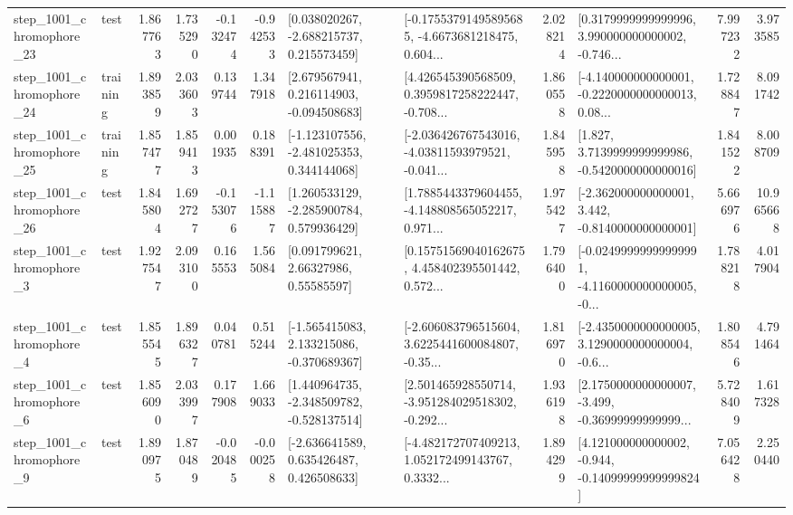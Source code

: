 \begin{tabular}{llrrrrllrlrr}
 step\_1001\_chromophore\_23 &      test &      1.867763 &    1.735290 &     -0.132474 & -0.942533 &    [0.038020267, -2.688215737, 0.215573459] &  [-0.17553791495895685, -4.6673681218475, 0.604... &       2.028214 &  [0.3179999999999996, 3.990000000000002, -0.746... &            7.997232 &          3.973585 \\
 step\_1001\_chromophore\_24 &  training &      1.893859 &    2.033603 &      0.139744 &  1.347918 &    [2.679567941, 0.216114903, -0.094508683] &  [4.426545390568509, 0.3959817258222447, -0.708... &       1.860558 &  [-4.140000000000001, -0.2220000000000013, 0.08... &            1.728847 &          8.091742 \\
 step\_1001\_chromophore\_25 &  training &      1.857477 &    1.859413 &      0.001935 &  0.188391 &   [-1.123107556, -2.481025353, 0.344144068] &  [-2.036426767543016, -4.03811593979521, -0.041... &       1.845958 &   [1.827, 3.7139999999999986, -0.5420000000000016] &            1.841522 &          8.008709 \\
 step\_1001\_chromophore\_26 &      test &      1.845804 &    1.692727 &     -0.153076 & -1.115887 &    [1.260533129, -2.285900784, 0.579936429] &  [1.7885443379604455, -4.148808565052217, 0.971... &       1.975427 &   [-2.362000000000001, 3.442, -0.8140000000000001] &            5.666976 &         10.965668 \\
  step\_1001\_chromophore\_3 &      test &      1.927547 &    2.093100 &      0.165553 &  1.565084 &       [0.091799621, 2.66327986, 0.55585597] &  [0.15751569040162675, 4.458402395501442, 0.572... &       1.796400 &  [-0.02499999999999991, -4.1160000000000005, -0... &            1.788218 &          4.017904 \\
  step\_1001\_chromophore\_4 &      test &      1.855545 &    1.896327 &      0.040781 &  0.515244 &   [-1.565415083, 2.133215086, -0.370689367] &  [-2.606083796515604, 3.6225441600084807, -0.35... &       1.816970 &  [-2.4350000000000005, 3.1290000000000004, -0.6... &            1.808546 &          4.791464 \\
  step\_1001\_chromophore\_6 &      test &      1.856090 &    2.033997 &      0.177908 &  1.669033 &   [1.440964735, -2.348509782, -0.528137514] &  [2.501465928550714, -3.951284029518302, -0.292... &       1.936198 &  [2.1750000000000007, -3.499, -0.36999999999999... &            5.728409 &          1.617328 \\
  step\_1001\_chromophore\_9 &      test &      1.890975 &    1.870489 &     -0.020485 & -0.000258 &    [-2.636641589, 0.635426487, 0.426508633] &  [-4.482172707409213, 1.052172499143767, 0.3332... &       1.894299 &  [4.121000000000002, -0.944, -0.14099999999999824] &            7.056428 &          2.250440 \\

\end{tabular}
